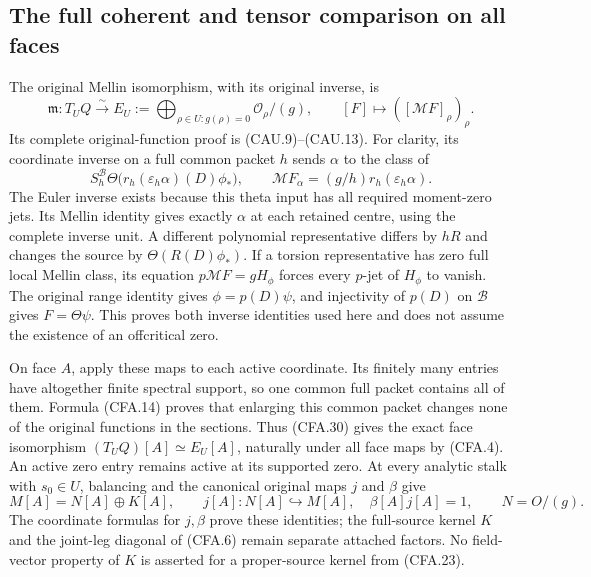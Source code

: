 \subsection{The full coherent and tensor comparison on all faces}

The original Mellin isomorphism, with its original inverse, is
\[
 \mathfrak m:T_UQ\xrightarrow{\sim}
 E_U:=\bigoplus_{\rho\in U:g(\rho)=0}\mathcal O_\rho/(g),
 \qquad[F]\mapsto([\mathcal MF]_\rho)_\rho.                  \tag{CFA.30}
\]
Its complete original-function proof is (CAU.9)--(CAU.13).
For clarity, its coordinate inverse on a full common packet $h$
sends $\alpha$ to the class of
\[
 S_h^{\mathscr B}\Theta\bigl(r_h(\varepsilon_h\alpha)(D)\phi_*\bigr),
 \qquad\mathcal M F_\alpha=(g/h)r_h(\varepsilon_h\alpha).
                                                               \tag{CFA.31}
\]
The Euler inverse exists because this theta input has all required
moment-zero jets.  Its Mellin identity gives exactly $\alpha$ at
each retained centre, using the complete inverse unit.  A different
polynomial representative differs by $hR$ and changes the source
by $\Theta(R(D)\phi_*)$.  If a torsion representative has zero
full local Mellin class, its equation $p\mathcal MF=gH_\phi$
forces every $p$-jet of $H_\phi$ to vanish.  The original range
identity gives $\phi=p(D)\psi$, and injectivity of $p(D)$ on
$\mathscr B$ gives $F=\Theta\psi$.  This proves both inverse
identities used here and does not assume the existence of an offcritical
zero.

On face $A$, apply these maps to each active coordinate.  Its finitely
many entries have altogether finite spectral support, so one common
full packet contains all of them.  Formula (CFA.14) proves that enlarging
this common packet changes none of the original functions in the
sections.  Thus (CFA.30) gives the exact face isomorphism
$(T_UQ)[A]\simeq E_U[A]$, naturally under all face maps by (CFA.4).
An active zero entry remains active at its supported zero.
At every analytic stalk with $s_0\in U$, balancing and the canonical original maps
$j$ and $\beta$ give
\[
 M[A]=N[A]\oplus K[A],\qquad
 j[A]:N[A]\hookrightarrow M[A],\quad
 \beta[A]j[A]=1,\qquad N=O/(g).                              \tag{CFA.32}
\]
The coordinate formulas for $j,\beta$ prove these identities; the
full-source kernel $K$ and the joint-leg diagonal of (CFA.6) remain
separate attached factors.  No field-vector property of $K$ is
asserted for a proper-source kernel from (CFA.23).

